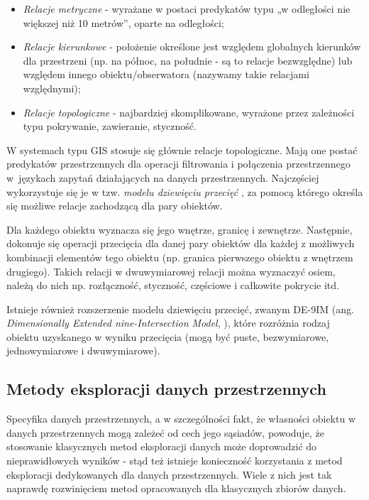 \documentclass[12pt]{article}
\begin{document}
\begin{itemize}
\item \textit{Relacje metryczne} - wyrażane w postaci predykatów typu „w odległości nie większej niż 10 metrów”, oparte na odległości;
\item \textit{Relacje kierunkowe} - położenie określone jest względem globalnych kierunków dla przestrzeni (np. na północ, na południe - są to relacje bezwzględne) lub względem innego obiektu/obserwatora (nazywamy takie relacjami względnymi);
\item \textit{Relacje topologiczne} - najbardziej skomplikowane, wyrażone przez zależności typu pokrywanie, zawieranie, styczność.
\end{itemize}

W systemach typu GIS stosuje się głównie relacje topologiczne. Mają one postać predykatów przestrzennych dla operacji filtrowania i połączenia przestrzennego w~językach zapytań działających na danych przestrzennych. Najczęściej wykorzystuje się je w tzw. \textit{modelu dziewięciu przecięć} \cite{9sec}, za pomocą którego określa się możliwe relacje zachodzącą dla pary obiektów.

Dla każdego obiektu wyznacza się jego wnętrze, granicę i zewnętrze. Następnie, dokonuje się operacji przecięcia dla danej pary obiektów dla każdej z możliwych kombinacji elementów tego obiektu (np. granica pierwszego obiektu z wnętrzem drugiego). Takich relacji w dwuwymiarowej relacji można wyznaczyć osiem, należą do nich np. rozłączność, styczność, częściowe i całkowite pokrycie itd. 

Istnieje również rozszerzenie modelu dziewięciu przecięć, zwanym DE-9IM (ang. \textit{Dimensionally Extended nine-Intersection Model}, \cite{9sec2}), które rozróżnia rodzaj obiektu uzyskanego w wyniku przecięcia (mogą być puste, bezwymiarowe, jednowymiarowe i dwuwymiarowe). 

\subsection{Metody eksploracji danych przestrzennych}

Specyfika danych przestrzennych, a w szczególności fakt, że własności obiektu w danych przestrzennych mogą zależeć od cech jego sąsiadów, powoduje, że stosowanie klasycznych metod eksploracji danych może doprowadzić do nieprawidłowych wyników \cite{klasykchuj1} \cite{klasykchuj2} - stąd też istnieje konieczność korzystania z metod eksploracji dedykowanych dla danych przestrzennych. Wiele z nich jest tak naprawdę rozwinięciem metod opracowanych dla klasycznych zbiorów danych.
\end{document}
